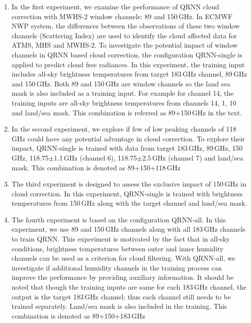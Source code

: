 \documentclass[amt, manuscript]{copernicus}
\begin{document}
\begin{enumerate}
	
	\item In the first experiment, we examine the performance of QRNN cloud correction with MWHS-2 window channels: 89 and 150\,GHz. In ECMWF NWP system, the differences between the observations of these two window channels (Scattering Index) \citep{Lu2015FY3C} are used to identify the cloud affected data for ATMS, MHS and MWHS-2. To investigate the potential impact of window channels in QRNN based cloud correction, the configuration QRNN-single is applied to predict cloud free radiances. In this experiment, the training input includes all-sky brightness temperatures from target 183\,GHz channel, 89\,GHz and 150\,GHz. Both 89 and 150\,GHz are window channels so the land sea mask is also included as a training input. For example for channel 14, the training inputs are all-sky brightness temperatures from channels 14, 1, 10 and land/sea mask. This combination is referred as 89+150\,GHz in the text.
	
	\item In the second experiment, we explore if few of low peaking channels of 118\,GHz could have any potential advantage in cloud correction. To explore their impact, QRNN-single is trained with data from target 183\,GHz, 89\,GHz, 150\,GHz, 118.75$\pm$1.1\,GHz (channel 6), 118.75$\pm$2.5\,GHz (channel 7) and land/sea mask. This combination is denoted as 89+150+118\,GHz
	
	\item The third experiment is designed to assess the exclusive impact of 150\,GHz in cloud correction. In this experiment, QRNN-single is trained with brightness temperatures from 150\,GHz along with the target channel and land/sea mask. 
	
	\item The fourth experiment is based on the configuration QRNN-all. In this experiment, we use 89 and 150\,GHz channels along with all 183\,GHz channels to train QRNN. This experiment is motivated by the fact that in all-sky conditions, brightness temperatures between outer and inner humidity channels can be used as a criterion for cloud filtering\cite{buehler:aclou:07}. With QRNN-all, we investigate if additional humidity channels in the training process can improve the performance by providing auxiliary information. It should be noted that though the training inputs are same for each 183\,GHz channel, the output is the target 183\,GHz channel; thus each channel still needs to be trained separately. Land/sea mask is also included in the training. This combination is denoted as 89+150+183\,GHz
\end{enumerate}
\end{document}
